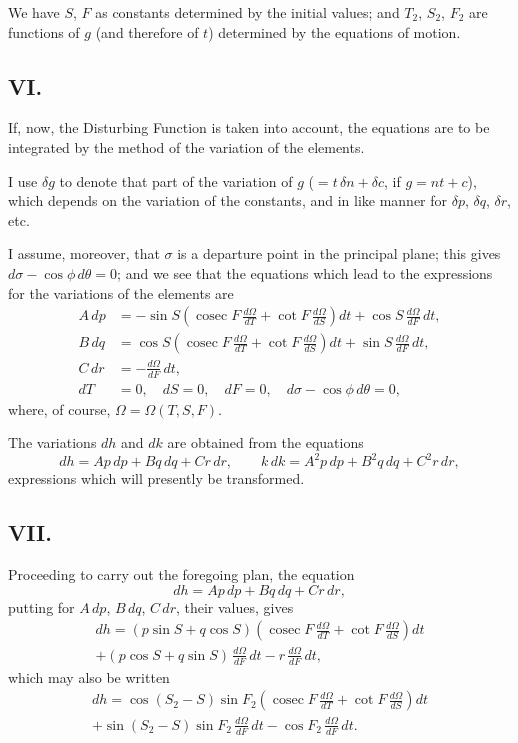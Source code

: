 \documentclass[11pt,a4paper]{article}
\DeclareMathOperator{\cosec}{cosec}
\begin{document}
We have $S$, $F$ as constants determined by the initial values; and $T_2$, $S_2$, $F_2$ are functions of $g$ (and therefore of $t$) determined by the equations of motion.

\subsection*{VI.}

If, now, the Disturbing Function is taken into account, the equations are to be integrated by the method of the variation of the elements.

I use $\delta g$ to denote that part of the variation of $g$ ($= t\,\delta n + \delta c$, if $g = nt + c$), which depends on the variation of the constants, and in like manner for $\delta p$, $\delta q$, $\delta r$, etc.

I assume, moreover, that $\sigma$ is a departure point in the principal plane; this gives $d\sigma - \cos\phi\,d\theta = 0$; and we see that the equations which lead to the expressions for the variations of the elements are
\begin{align*}
A\,dp &= -\sin S\left(\cosec F\,\frac{d\Omega}{dT} + \cot F\,\frac{d\Omega}{dS}\right)dt + \cos S\,\frac{d\Omega}{dF}\,dt, \\
B\,dq &= \cos S\left(\cosec F\,\frac{d\Omega}{dT} + \cot F\,\frac{d\Omega}{dS}\right)dt + \sin S\,\frac{d\Omega}{dF}\,dt, \\
C\,dr &= -\frac{d\Omega}{dF}\,dt, \\
dT &= 0, \quad dS = 0, \quad dF = 0, \quad d\sigma - \cos\phi\,d\theta = 0,
\end{align*}
where, of course, $\Omega = \Omega(T, S, F)$.

The variations $dh$ and $dk$ are obtained from the equations
\[
dh = Ap\,dp + Bq\,dq + Cr\,dr, \qquad k\,dk = A^2p\,dp + B^2q\,dq + C^2r\,dr,
\]
expressions which will presently be transformed.

\subsection*{VII.}

Proceeding to carry out the foregoing plan, the equation
\[
dh = Ap\,dp + Bq\,dq + Cr\,dr,
\]
putting for $A\,dp$, $B\,dq$, $C\,dr$, their values, gives
\begin{multline}
dh = (p\sin S + q\cos S)\left(\cosec F\,\frac{d\Omega}{dT} + \cot F\,\frac{d\Omega}{dS}\right)dt \\
+ (p\cos S + q\sin S)\,\frac{d\Omega}{dF}\,dt - r\,\frac{d\Omega}{dF}\,dt,
\end{multline}
which may also be written
\begin{multline}
dh = \cos(S_2-S)\sin F_2\left(\cosec F\,\frac{d\Omega}{dT} + \cot F\,\frac{d\Omega}{dS}\right)dt \\
+ \sin(S_2-S)\sin F_2\,\frac{d\Omega}{dF}\,dt - \cos F_2\,\frac{d\Omega}{dF}\,dt.
\end{multline}
\end{document}
